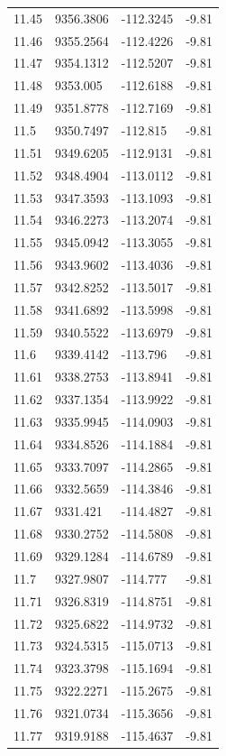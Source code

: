 \begin{table}[H]
\begin{tabular}{llll}
11.45 & 9356.3806 & -112.3245 & -9.81 \\
11.46 & 9355.2564 & -112.4226 & -9.81 \\
11.47 & 9354.1312 & -112.5207 & -9.81 \\
11.48 & 9353.005 & -112.6188 & -9.81 \\
11.49 & 9351.8778 & -112.7169 & -9.81 \\
11.5 & 9350.7497 & -112.815 & -9.81 \\
11.51 & 9349.6205 & -112.9131 & -9.81 \\
11.52 & 9348.4904 & -113.0112 & -9.81 \\
11.53 & 9347.3593 & -113.1093 & -9.81 \\
11.54 & 9346.2273 & -113.2074 & -9.81 \\
11.55 & 9345.0942 & -113.3055 & -9.81 \\
11.56 & 9343.9602 & -113.4036 & -9.81 \\
11.57 & 9342.8252 & -113.5017 & -9.81 \\
11.58 & 9341.6892 & -113.5998 & -9.81 \\
11.59 & 9340.5522 & -113.6979 & -9.81 \\
11.6 & 9339.4142 & -113.796 & -9.81 \\
11.61 & 9338.2753 & -113.8941 & -9.81 \\
11.62 & 9337.1354 & -113.9922 & -9.81 \\
11.63 & 9335.9945 & -114.0903 & -9.81 \\
11.64 & 9334.8526 & -114.1884 & -9.81 \\
11.65 & 9333.7097 & -114.2865 & -9.81 \\
11.66 & 9332.5659 & -114.3846 & -9.81 \\
11.67 & 9331.421 & -114.4827 & -9.81 \\
11.68 & 9330.2752 & -114.5808 & -9.81 \\
11.69 & 9329.1284 & -114.6789 & -9.81 \\
11.7 & 9327.9807 & -114.777 & -9.81 \\
11.71 & 9326.8319 & -114.8751 & -9.81 \\
11.72 & 9325.6822 & -114.9732 & -9.81 \\
11.73 & 9324.5315 & -115.0713 & -9.81 \\
11.74 & 9323.3798 & -115.1694 & -9.81 \\
11.75 & 9322.2271 & -115.2675 & -9.81 \\
11.76 & 9321.0734 & -115.3656 & -9.81 \\
11.77 & 9319.9188 & -115.4637 & -9.81 \\

\end{tabular}
\end{table}
